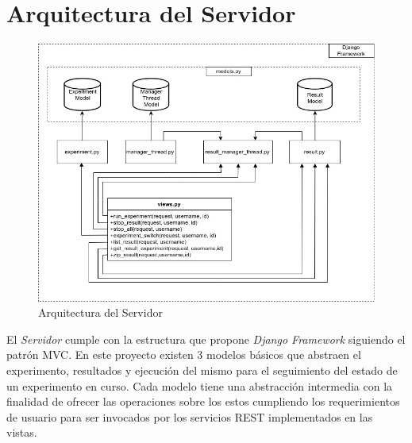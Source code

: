 \section{Arquitectura del Servidor}
\begin{figure}[!htb]
    \includegraphics[width=\linewidth]{../figures/d20.jpg}
    \caption{Arquitectura del Servidor}
    \label{fig:d20}
\end{figure}

El \textit{Servidor} cumple con la estructura que propone \textit{Django Framework} siguiendo el 
patr\'on MVC\cite{django_tutorial}. En este proyecto existen 3 modelos b\'asicos que abstraen el experimento, resultados
y ejecuci\'on del mismo para el seguimiento del estado de un experimento en curso.
Cada modelo tiene una abstracci\'on intermedia con la finalidad de ofrecer las operaciones sobre
los estos cumpliendo los requerimientos de usuario para ser invocados por los servicios REST implementados
en las vistas.

\newpage